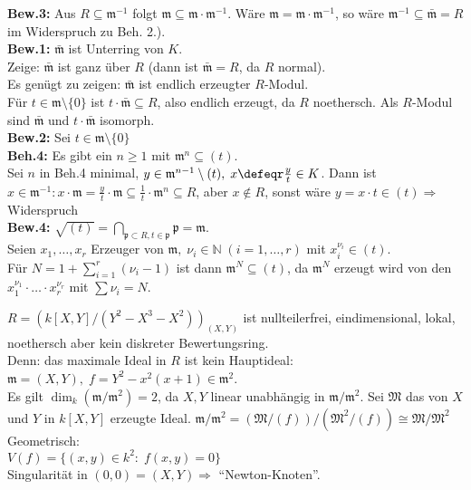 \begin{Bew}
\textbf{Bew.3:} Aus $R \subseteq \mathfrak{m}^{-1}$ folgt $\mathfrak{m}
\subseteq \mathfrak{m} \cdot \mathfrak{m}^{-1}$. Wäre $\mathfrak{m} =
\mathfrak{m} \cdot \mathfrak{m}^{-1}$, so wäre $\mathfrak{m}^{-1} \subseteq
\bar{\mathfrak{m}} = R$ im Widerspruch zu Beh. 2.).\\
\textbf{Bew.1:} $\bar{\mathfrak{m}}$ ist Unterring von $K$.\\
Zeige: $\bar{\mathfrak{m}}$ ist ganz über $R$ (dann ist $\bar{\mathfrak{m}} =
R$, da $R$ normal).\\
Es genügt zu zeigen: $\bar{\mathfrak{m}}$ ist endlich erzeugter $R$-Modul.\\
Für $t \in \mathfrak{m} \setminus \{0\}$ ist $t \cdot \bar{\mathfrak{m}}
\subseteq R$, also endlich erzeugt, da $R$ noethersch.
Als $R$-Modul sind $\bar{\mathfrak{m}}$ und $t \cdot \bar{\mathfrak{m}}$
isomorph.\\
\textbf{Bew.2:} Sei $t \in \mathfrak{m} \setminus\{0\}$\\
\textbf{Beh.4:} Es gibt ein $n \geq 1$ mit $\mathfrak{m}^n \subseteq (t)$.\\
Sei $n$ in Beh.4 minimal, $y \in \mathfrak{m}^{n-1} \setminus (t), \; x \defeqr
\frac{y}{t} \in K$.
Dann ist $x \in \mathfrak{m}^{-1}: x \cdot \mathfrak{m} = \frac{y}{t} \cdot
\mathfrak{m} \subseteq \frac{1}{t} \cdot \mathfrak{m}^n \subseteq R$, aber $x
\not\in R$, sonst wäre $y = x \cdot t \in (t) \Rightarrow$ Widerspruch\\
\textbf{Bew.4:} $\sqrt{(t)} = \bigcap_{\mathfrak{p} \subset R, t \in
\mathfrak{p}} \mathfrak{p} = \mathfrak{m}$.\\
Seien $x_1, \dots, x_r$ Erzeuger von $\mathfrak{m}, \; \nu_i \in \mathbb{N}
\;(i=1, \dots,r)$ mit $x_i^{\nu_i} \in (t)$.\\
Für $N = 1 + \sum_{i =1}^r(\nu_i -1)$ ist dann $\mathfrak{m}^N \subseteq (t)$,
da $\mathfrak{m}^N$ erzeugt wird von den $x_1^{\nu_1} \cdot \ldots \cdot
x_r^{\nu_r}$ mit $\sum \nu_i = N$.
\end{Bew}

\begin{nnBsp}
$R = (k[X,Y]/(Y^2-X^3-X^2))_{(X,Y)}$ ist nullteilerfrei, eindimensional, lokal, noethersch aber kein diskreter Bewertungsring.\\
Denn: das maximale Ideal in $R$ ist kein Hauptideal: $\mathfrak{m}=(X,Y), \; f = Y^2-x^2(x+1) \in \mathfrak{m}^2$.\\
Es gilt $\dim_k(\mathfrak{m}/\mathfrak{m}^2) = 2$, da $X,Y$ linear unabhängig in $\mathfrak{m}/\mathfrak{m}^2$.
Sei $\mathfrak{M}$ das von $X$ und $Y$ in $k[X,Y]$ erzeugte Ideal.
$\mathfrak{m}/\mathfrak{m}^2 = (\mathfrak{M}/(f))/(\mathfrak{M}^2/(f)) \cong \mathfrak{M}/\mathfrak{M}^2$\\
Geometrisch:\\
$V(f) = \{(x,y) \in k^2: \; f(x,y) = 0\}$\\
Singularität in $(0,0) = (X,Y) \Rightarrow$ ``Newton-Knoten''.
\end{nnBsp}
